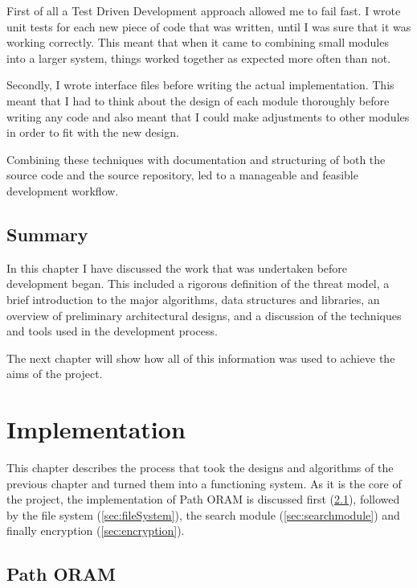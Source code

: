 \documentclass[12pt,a4paper,twoside,openright]{report}
\begin{document}
First of all a Test Driven Development approach allowed me to fail fast. I wrote unit tests for each new piece of code that was written, until I was sure that it was working correctly. This meant that when it came to combining small modules into a larger system, things worked together as expected more often than not.

Secondly, I wrote interface files before writing the actual implementation. This meant that I had to think about the design of each module thoroughly before writing any code and also meant that I could make adjustments to other modules in order to fit with the new design.

Combining these techniques with documentation and structuring of both the source code and the source repository, led to a manageable and feasible development workflow.

\section{Summary}

In this chapter I have discussed the work that was undertaken before development began. This included a rigorous definition of the threat model, a brief introduction to the major algorithms, data structures and libraries, an overview of preliminary architectural designs, and a discussion of the techniques and tools used in the development process.

The next chapter will show how all of this information was used to achieve the aims of the project.

\chapter{Implementation}

This chapter describes the process that took the designs and algorithms of the previous chapter and turned them into a functioning system. As it is the core of the project, the implementation of Path ORAM is discussed first (\cref{sec:pathORAM}), followed by the file system (\cref{sec:fileSystem}), the search module (\cref{sec:searchmodule}) and finally encryption (\cref{sec:encryption}).


\section{Path ORAM}
\label{sec:pathORAM}
\end{document}
